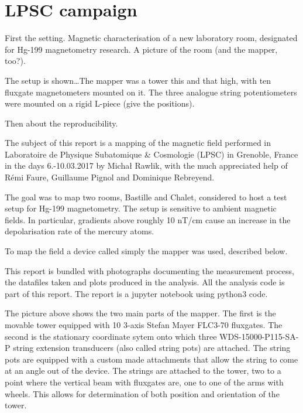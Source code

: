 \section{LPSC campaign}
First the setting. Magnetic characterisation of a new laboratory room, designated for Hg-199 magnetometry research.
A picture of the room (and the mapper, too?).

The setup is shown\ldots The mapper was a tower this and that high, with ten fluxgate magnetometers mounted on it.
The three analogue string potentiometers were mounted on a rigid L-piece (give the positions).

Then about the reproducibility.

The subject of this report is a mapping of the magnetic field performed in Laboratoire de Physique Subatomique & Cosmologie (LPSC) in Grenoble, France in the days 6.-10.03.2017 by Michał Rawlik, with the much appreciated help of Rémi Faure, Guillaume Pignol and Dominique Rebreyend.

The goal was to map two rooms, Bastille and Chalet, considered to host a test setup for Hg-199 magnetometry. The setup is sensitive to ambient magnetic fields. In particular, gradients above roughly 10 nT/cm cause an increase in the depolarisation rate of the mercury atoms.

To map the field a device called simply the mapper was used, described below.

This report is bundled with photographs documenting the measurement process, the datafiles taken and plots produced in the analysis. All the analysis code is part of this report. The report is a jupyter notebook using python3 code.


The picture above shows the two main parts of the mapper. The first is the movable tower equipped with 10 3-axis Stefan Mayer FLC3-70 fluxgates. The second is the stationary coordinate sytem onto which three WDS-15000-P115-SA-P string extension transducers (also called string pots) are attached. The string pots are equipped with a custom made attachments that allow the string to come at an angle out of the device. The strings are attached to the tower, two to a point where the vertical beam with fluxgates are, one to one of the arms with wheels. This allows for determination of both position and orientation of the tower.

